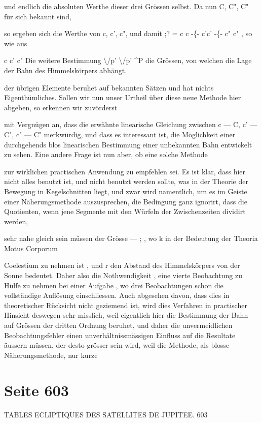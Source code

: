 \documentclass[10pt,a4paper]{article}
\begin{document}
und endlich die absoluten Werthe dieser drei Grössen selbst. Da nun C, C", C" für sich bekannt sind,

so ergeben sich die Werthe von c, c', c", und damit ;? = c c -\{- c'c' -\{- c" c" , so wie aus

c c' c" Die weitere Bestimmung \textbackslash{}/p' \textbackslash{}/p' \textasciicircum{}P die Grössen, von welchen die Lage der Bahn des Himmelskörpers abhängt.

der übrigen Elemente beruhet auf bekannten Sätzen und hat nichts Eigenthümliches. Sollen wir nun unser Urtheil über diese neue Methode hier abgeben, so erkennen wir zuvörderst

mit Vergnügen an, dass die erwähnte linearische Gleichung zwischen c — C, c' — C", c" — C" merkwürdig, und dass es interessant ist, die Möglichkeit einer durchgehends blos linearischen Bestimmung einer unbekannten Bahn entwickelt zu sehen. Eine andere Frage ist nun aber, ob eine solche Methode

zur wirklichen practischen Anwendung zu empfehlen sei. Es ist klar, dass hier nicht alles benutzt ist, und nicht benutzt werden sollte, was in der Theorie der Bewegung in Kegelschnitten liegt, und zwar wird namentlich, um es im Geiste einer Näherungsmethode auszusprechen, die Bedingung ganz ignorirt, dass die Quotienten, wenn jene Segmente mit den Würfeln der Zwischenzeiten dividirt werden,

sehr nahe gleich sein müssen der Grösse — ; , wo k in der Bedeutung der Theoria Motus Corporum

Coelestium zu nehmen ist , und r den Abstand des Himmelskörpers von der Sonne bedeutet. Daher also die Nothwendigkeit , eine vierte Beobachtung zu Hülfe zu nehmen bei einer Aufgabe , wo drei Beobachtungen schon die vollständige Auflösung einschliessen. Auch abgesehen davon, dass dies in theoretischer Rücksicht nicht geziemend ist, wird dies Verfahren in practischer Hinsicht deswegen sehr misslich, weil eigentlich hier die Bestimmung der Bahn auf Grössen der dritten Ordnung beruhet, und daher die unvermeidlichen Beobachtungsfehler einen unverhältnissmässigen Einfluss auf die Resultate äussern müssen, der desto grösser sein wird, weil die Methode, als blosse Näherungsmethode, nur kurze


\newpage
\section*{Seite 603}
TABLES ECLIPTIQUES DES SATELLITES DE JUPITEE. 603
\end{document}
